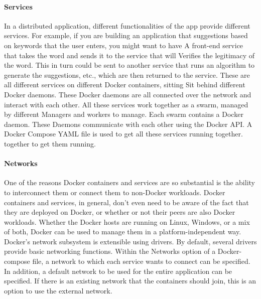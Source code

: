 		\paragraph{Services}
		In a distributed application, different functionalities of the app provide different services. For example, if you are building an application that suggestions based on keywords that the user enters, you might want to have A front-end service that takes the word and sends it to the service that will Verifies the legitimacy of the word. This in turn could be sent to another service that runs an algorithm to generate the suggestions, etc., which are then returned to the service. These are all different services on different Docker containers, sitting Sit behind different Docker daemons. These Docker daemons are all connected over the network and interact with each other.
		All these services work together as a swarm, managed by different Managers and workers to manage. Each swarm contains a Docker daemon. These Daemons communicate with each other using the Docker API. A Docker Compose YAML file is used to get all these services running together. together to get them running. 

		\paragraph{Networks}
		One of the reasons Docker containers and services are so substantial is the ability to interconnect them or connect them to non-Docker workloads. Docker containers and services, in general, don't even need to be aware of the fact that they are deployed on Docker, or whether or not their peers are also Docker workloads. Whether the Docker hosts are running on Linux, Windows, or a mix of both, Docker can be used to manage them in a platform-independent way. Docker's network subsystem is extensible using drivers. By default, several drivers provide basic networking functions.\cite{dockerNetwork} 
		Within the Networks option of a Docker-compose file,  a network to which each service wants to connect can be specified. In addition, a default network to be used for the entire application can be specified. If there is an existing network that the containers should join, this is an option to use the external network.\cite{Kinnary2018}
		
